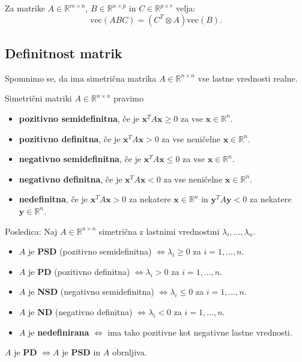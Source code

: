 \documentclass{article}
\begin{document}
\begin{multicols}{2}
Za matrike \( A \in \mathbb{R}^{m \times n} \), \( B \in \mathbb{R}^{n \times p} \) in \( C \in \mathbb{R}^{p \times r} \) velja:
\[
\text{vec}(ABC) = (C^T \otimes A)\text{vec}(B).
\]

\subsection{Definitnost matrik}

Spomnimo se, da ima simetrična matrika \( A \in \mathbb{R}^{n \times n} \) vse lastne vrednosti realne.

Simetrični matriki \( A \in \mathbb{R}^{n \times n} \) pravimo
\begin{itemize}
  \item \textbf{pozitivno semidefinitna}, če je \( \mathbf{x}^T A \mathbf{x} \geq 0 \) za vse \( \mathbf{x} \in \mathbb{R}^n \).
  \item \textbf{pozitivno definitna}, če je \( \mathbf{x}^T A \mathbf{x} > 0 \) za vse neničelne \( \mathbf{x} \in \mathbb{R}^n \).
  \item \textbf{negativno semidefinitna}, če je \( \mathbf{x}^T A \mathbf{x} \leq 0 \) za vse \( \mathbf{x} \in \mathbb{R}^n \).
  \item \textbf{negativno definitna}, če je \( \mathbf{x}^T A \mathbf{x} < 0 \) za vse neničelne \( \mathbf{x} \in \mathbb{R}^n \).
  \item \textbf{nedefinitna}, če je \( \mathbf{x}^T A \mathbf{x} > 0 \) za nekatere \( \mathbf{x} \in \mathbb{R}^n \) in \( \mathbf{y}^T A \mathbf{y} < 0 \) za nekatere \( \mathbf{y} \in \mathbb{R}^n \).
\end{itemize}

Posledica: Naj \( A \in \mathbb{R}^{n \times n} \) simetrična z lastnimi vrednostmi \( \lambda_i, \ldots, \lambda_n \).
\begin{itemize}
  \item \( A \) je \textbf{PSD} (pozitivno semidefinitna) \( \Leftrightarrow \lambda_i \geq 0 \) za \( i=1,\ldots,n \).
  \item \( A \) je \textbf{PD} (pozitivno definitna) \( \Leftrightarrow \lambda_i > 0 \) za \( i=1,\ldots,n \).
  \item \( A \) je \textbf{NSD} (negativno semidefinitna) \( \Leftrightarrow \lambda_i \leq 0 \) za \( i=1,\ldots,n \).
  \item \( A \) je \textbf{ND} (negativno definitna) \( \Leftrightarrow \lambda_i < 0 \) za \( i=1,\ldots,n \).
  \item \( A \) je \textbf{nedefinirana} \( \Leftrightarrow \) ima tako pozitivne kot negativne lastne vrednosti.
\end{itemize}
\( A \) je \textbf{PD} \( \Leftrightarrow A \) je \textbf{PSD} in \( A \) obrnljiva.


\end{multicols}
\end{document}
